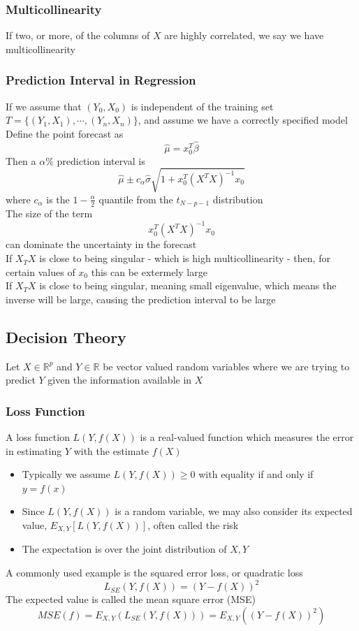 \documentclass[11pt]{article}
\newcommand{\R}{{\mathbb{R}}}
\begin{document}
\subsubsection{Multicollinearity}
If two, or more, of the columns of $X$ are highly correlated, we say we have multicollinearity
\subsubsection{Prediction Interval in Regression}
If we assume that $(Y_0,X_0)$ is independent of the training set $T=\{(Y_1,X_1),\cdots,(Y_n,X_n)\}$, and assume we have a correctly specified model \\
Define the point forecast as \[\hat{\mu}=x_0^T\hat{\beta}\]   
Then a $\alpha\%$ prediction interval is 
\[\hat{\mu}\pm c_\alpha\hat{\sigma}\sqrt{1+x_0^T(X^TX)^{-1}x_0}\]
where $c_\alpha$ is the $1-\frac{\alpha}{2}$ quantile from the $t_{N-p-1}$ distribution \\
The size of the term \[x_0^T(X^TX)^{-1}x_0\] can dominate the uncertainty in the forecast \\
If $X_TX$ is close to being singular - which is high multicollinearity - then, for certain values of $x_0$ this can be extermely large \\
If $X_TX$ is close to being singular, meaning small eigenvalue, which means the inverse will be large, causing the prediction interval to be large 
\subsection{Decision Theory}
Let $X\in\R^p$ and $Y\in\R$ be vector valued random variables where we are trying to predict $Y$ given the information available in $X$ 
\subsubsection{Loss Function}
A loss function $L(Y,f(X))$ is a real-valued function which measures the error in estimating $Y$ with the estimate $f(X)$
\begin{itemize}
    \item Typically we assume $L(Y,f(X))\geq 0$ with equality if and only if $y=f(x)$
    \item Since $L(Y,f(X))$ is a random variable, we may also consider its expected value, $E_{X,Y}[L(Y,f(X))]$, often called the risk
    \item The expectation is over the joint distribution of $X,Y$
\end{itemize}
A commonly used example is the squared error loss, or quadratic loss 
\[L_{SE}(Y,f(X)) = (Y-f(X))^2\]    
The expected value is called the mean square error (MSE)
\[MSE(f) = E_{X,Y}(L_{SE}(Y,f(X))) = E_{X,Y}((Y-f(X))^2)\]   
\end{document}

